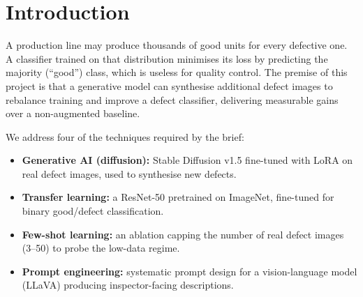 \documentclass[11pt]{article}
\begin{document}
\begin{abstract}
Manufacturing defects are rare, so defect classifiers trained on the resulting
class imbalance tend to collapse to predicting ``good''. We investigate whether
synthesising defect images with a fine-tuned diffusion model (Stable Diffusion
+ LoRA) improves a transfer-learning defect classifier on three MVTec~AD
categories (\textit{bottle}, \textit{hazelnut}, \textit{carpet}). Our augmented
method improves defect F1 by \mbox{+5--14\%} over the no-augmentation baseline
across all three categories, reaching a perfect score on \textit{hazelnut}.
A key finding is that the value of diffusion augmentation \emph{tracks synthetic
image quality}: the only category where diffusion beats classical augmentation
(\textit{hazelnut}) is also the one with the lowest FID. We further show that the
detection problem saturates rapidly under proper transfer learning---on
\textit{bottle}, three real defect images already suffice---which both explains
where augmentation helps and motivates honest reporting of when it does not.
The system is delivered as a reproducible pipeline with Grad-CAM localisation
and a FastAPI/Next.js inspector demo.
\end{abstract}

\section{Introduction}
A production line may produce thousands of good units for every defective one.
A classifier trained on that distribution minimises its loss by predicting the
majority (``good'') class, which is useless for quality control. The premise of
this project is that a generative model can synthesise additional defect images
to rebalance training and improve a defect classifier, delivering measurable
gains over a non-augmented baseline.

We address four of the techniques required by the brief:
\begin{itemize}
  \item \textbf{Generative AI (diffusion):} Stable Diffusion v1.5 fine-tuned
        with LoRA on real defect images, used to synthesise new defects.
  \item \textbf{Transfer learning:} a ResNet-50 pretrained on ImageNet,
        fine-tuned for binary good/defect classification.
  \item \textbf{Few-shot learning:} an ablation capping the number of real
        defect images (3--50) to probe the low-data regime.
  \item \textbf{Prompt engineering:} systematic prompt design for a
        vision-language model (LLaVA) producing inspector-facing descriptions.
\end{itemize}
\end{document}
